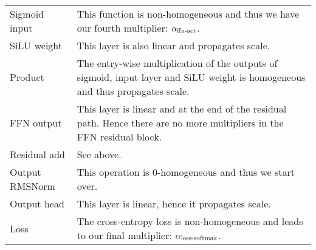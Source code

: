 \begin{table*}[ht]
\begin{tabular}{p{3.5cm}p{9.75cm}}
    Sigmoid input & This function is non-homogeneous and thus we have our fourth multiplier: $\alpha_{\mathrm{ffn{\text -}act}}$.
    \\
    SiLU weight & This layer is also linear and propagates scale.
    \\
    Product & The entry-wise multiplication of the outputs of sigmoid, input layer and SiLU weight is homogeneous and thus propagates scale.
    \\
    FFN output & This layer is linear and at the end of the residual path. Hence there are no more multipliers in the FFN residual block.
    \\
    Residual add & See above.
    \\\midrule
    Output RMSNorm & This operation is $0$-homogeneous and thus we start over.
    \\
    Output head & This layer is linear, hence it propagates scale.
    \\
    Loss & The cross-entropy loss is non-homogeneous and leads to our final multiplier: $\alpha_{\mathrm{loss{\text -}softmax}}$.
    \\
    \bottomrule
\end{tabular}
\end{table*}

